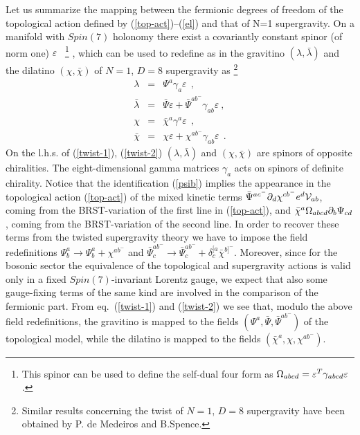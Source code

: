\documentclass[a4paper,12pt]{article}
\let\nn=\nonumber
\def\V{{\cal V}}
\begin{document}
Let us summarize the mapping between the fermionic degrees of freedom
of the topological action defined by (\ref{top-act})--(\ref{el})
and that of N=1 supergravity.
On a manifold with $Spin(7)$ holonomy there exist
a covariantly constant spinor (of norm one) $\varepsilon$~
\footnote{This spinor can be used to define the
self-dual four form as 
$ \Omega_{abcd}=\varepsilon^T \gamma_{abcd}\varepsilon$
\cite{bakasi}. }
, which can be used to redefine as in \cite{BT2}
the gravitino $(\lambda, \bar\lambda)$ and the
dilatino $(\chi, \bar\chi)$ of $N=1$, $D=8$ supergravity as
\footnote{Similar results concerning the twist of $N=1$, $D=8$
supergravity have been obtained by P. de Medeiros and B.Spence.}
\begin{eqnarray}
\lambda &=& \Psi^a \gamma_a \varepsilon \ \ , \nonumber\\ 
\bar\lambda &=& \bar\Psi \varepsilon + 
\bar\Psi^{ab^-}\gamma_{ab}\varepsilon\ ,
\label{twist-1} \\
\chi &=& \bar\chi^a \gamma^a \varepsilon \ \ , \nn\\
\bar\chi &=& \chi\varepsilon +
\chi^{ab^-}\gamma_{ab}\varepsilon \ \ .
\label{twist-2}
\end{eqnarray}
On the l.h.s. of (\ref{twist-1}), (\ref{twist-2}) $(\lambda, \bar\lambda)$
and $(\chi, \bar\chi)$ are spinors
of opposite chiralities. The eight-dimensional gamma matrices 
$\gamma_a$ acts on spinors of definite chirality.
Notice that the identification (\ref{psib}) implies the
appearance in the topological action (\ref{top-act}) of the mixed
kinetic terms $\bar\Psi^{ac^-}\partial_d\chi^{cb^-} e^d \V_{ab}$,
coming from the BRST-variation of the first line in (\ref{top-act}),
and $\bar\chi^a\Omega_{abcd}\partial_b\Psi_{cd}$, coming from the 
BRST-variation of the second line.
In order to
recover these terms from the twisted supergravity theory 
we have to impose the field redefinitions
$\Psi_b^a\rightarrow \Psi_b^a + \chi^{ab^-}$ and 
$\bar\Psi_c^{ab^-} \rightarrow \bar\Psi^{ab^-}_c + \delta^{[a}_c
\bar\chi^{b]^-}$. Moreover, since for the bosonic sector the
equivalence of the topological and supergravity actions
is valid only in a fixed $Spin(7)$-invariant Lorentz gauge,
we expect that also some gauge-fixing terms of the same kind
are involved in the comparison of the fermionic part.
From eq.~(\ref{twist-1}) and (\ref{twist-2})
we see that, modulo the above field redefinitions, the gravitino is mapped
to the fields $(\Psi^a, \bar\Psi, \bar\Psi^{ab^-})$ of the topological
model, while the dilatino is mapped to the fields
$(\bar\chi^a, \chi, \chi^{ab^-})$.
\end{document}

